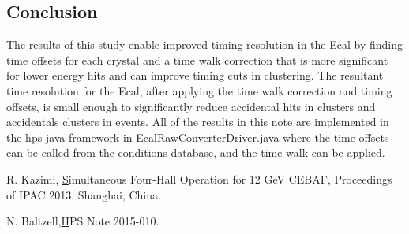 \documentclass[twoside]{article}
\begin{document}
\begin{multicols}{2}

\section{Conclusion}

The results of this study enable improved timing resolution in the Ecal by finding time offsets for each crystal and a time walk correction that is more significant for lower energy hits and can improve timing cuts in clustering. The resultant time resolution for the Ecal, after applying the time walk correction and timing offsets, is small enough to significantly reduce accidental hits in clusters and accidentals clusters in events. All of the results in this note are implemented in the hps-java framework in EcalRawConverterDriver.java where the time offsets can be called from the conditions database, and the time walk can be applied. 


\begin{thebibliography}{99} %

 R. Kazimi,
\href{http://accelconf.web.cern.ch/accelconf/ipac2013/papers/thpfi091.pdf} Simultaneous Four-Hall Operation for 12 GeV CEBAF, Proceedings of IPAC 2013, Shanghai, China.

 N. Baltzell,\href{https://confluence.slac.stanford.edu/download/attachments/192191938/3PoleAna.pdf?version=1&modificationDate=1434062944000&api=v2}
HPS Note 2015-010.
\end{thebibliography}


\end{multicols}
\end{document}
